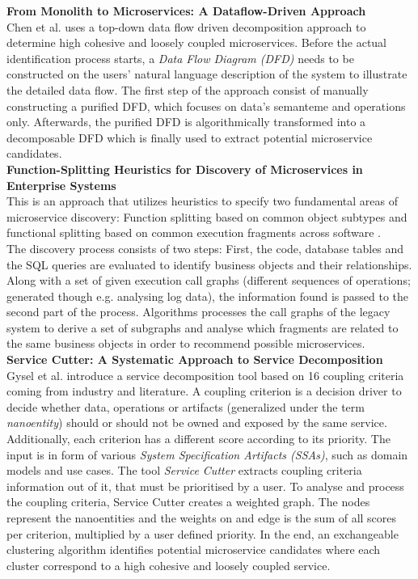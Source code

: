 \noindent
\textbf{From Monolith to Microservices: A Dataflow-Driven Approach } \\
Chen et al. \cite{DataflowDrivenChen} uses a top-down data flow driven decomposition approach to determine high cohesive and loosely coupled microservices. Before the actual identification process starts, a \textit{Data Flow Diagram (DFD)} needs to be constructed on the users' natural language description of the system to illustrate the detailed data flow. The first step of the approach consist of manually constructing a purified DFD, which focuses on data's semanteme and operations only. Afterwards, the purified DFD is algorithmically transformed into a decomposable DFD which is finally used to extract potential microservice candidates. \\


\noindent
\textbf{Function-Splitting Heuristics for Discovery of Microservices in Enterprise Systems  } \\
This is an approach that utilizes heuristics to specify two fundamental areas of microservice discovery: Function splitting based on common object subtypes and functional splitting based on common execution fragments across software \cite{HeuristicsAlwis}. \\
The discovery process consists of two steps: First, the code, database tables and the SQL queries are evaluated to identify business objects and their relationships. Along with a set of given execution call graphs (different sequences of operations; generated though e.g. analysing log data), the information found is passed to the second part of the process. Algorithms processes the call graphs of the legacy system to derive a set of subgraphs and analyse which fragments are related to the same business objects in order to recommend possible microservices. \\

\noindent
\textbf{Service Cutter: A Systematic Approach to Service Decomposition  } \\
Gysel et al. \cite{ServiceCutter} introduce a service decomposition tool based on 16 coupling criteria coming from industry and literature. A coupling criterion is a decision driver to decide whether data, operations or artifacts (generalized under the term \textit{nanoentity}) should or should not be owned and exposed by the same service. Additionally, each criterion has a different score according to its priority.
The input is in form of various \textit{System Specification Artifacts (SSAs)}, such as domain models and use cases.  The tool \textit{Service Cutter} extracts coupling criteria information out of it, that must be prioritised by a user. To analyse and process the coupling criteria, Service Cutter creates a weighted graph. The nodes represent the nanoentities and the weights on and edge is the sum of all scores per criterion, multiplied by a user defined priority. In the end, an exchangeable clustering algorithm identifies potential microservice candidates where each cluster correspond to a high cohesive and loosely coupled service.
 
